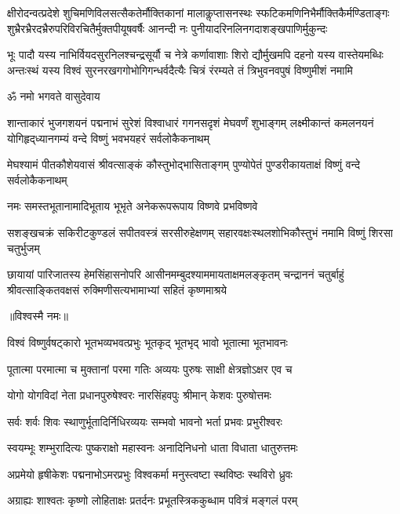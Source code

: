 \resetShloka
\setlength{\shlokaspaceskip}{12pt}
\fourlineindentedshloka
{क्षीरोदन्वत्प्रदेशे शुचिमणिविलसत्सैकतेर्मौक्तिकानां}
{मालाकॢप्तासनस्थः स्फटिकमणिनिभैर्मौक्तिकैर्मण्डिताङ्गः}
{शुभ्रैरभ्रैरदभ्रैरुपरिविरचितैर्मुक्तपीयूषवर्षैः}
{आनन्दी नः पुनीयादरिनलिनगदाशङ्खपाणिर्मुकुन्दः}

\fourlineindentedshloka
{भूः पादौ यस्य नाभिर्वियदसुरनिलश्चन्द्रसूर्यौ च नेत्रे}
{कर्णावाशाः शिरो द्यौर्मुखमपि दहनो यस्य वास्तेयमब्धिः}
{अन्तःस्थं यस्य विश्वं सुरनरखगगोभोगिगन्धर्वदैत्यैः}
{चित्रं रंरम्यते तं त्रिभुवनवपुषं विष्णुमीशं नमामि}

\centerline{ॐ नमो भगवते वासुदेवाय}
\fourlineindentedshloka
{शान्ताकारं भुजगशयनं पद्मनाभं सुरेशं}
{विश्वाधारं गगनसदृशं मेघवर्णं शुभाङ्गम्}
{लक्ष्मीकान्तं कमलनयनं योगिहृद्‌ध्यानगम्यं}
{वन्दे विष्णुं भवभयहरं सर्वलोकैकनाथम्}

\fourlineindentedshloka
{मेघश्यामं पीतकौशेयवासं}
{श्रीवत्साङ्कं कौस्तुभोद्भासिताङ्गम्}
{पुण्योपेतं पुण्डरीकायताक्षं}
{विष्णुं वन्दे सर्वलोकैकनाथम्}

\twolineshloka
{नमः समस्तभूतानामादिभूताय भूभृते}
{अनेकरूपरूपाय विष्णवे प्रभविष्णवे}

\fourlineindentedshloka
{सशङ्खचक्रं सकिरीटकुण्डलं}
{सपीतवस्त्रं सरसीरुहेक्षणम्}
{सहारवक्षःस्थलशोभिकौस्तुभं}
{नमामि विष्णुं शिरसा चतुर्भुजम्}

\fourlineindentedshloka
{छायायां पारिजातस्य हेमसिंहासनोपरि}
{आसीनमम्बुदश्याममायताक्षमलङ्कृतम्}
{चन्द्राननं चतुर्बाहुं श्रीवत्साङ्कितवक्षसं}
{रुक्मिणीसत्यभामाभ्यां सहितं कृष्णमाश्रये}

\centerline{॥विश्वस्मै नमः॥}\nopagebreak[4]
\resetShloka
\twolineshloka
{विश्वं विष्णुर्वषट्कारो भूतभव्यभवत्प्रभुः}
{भूतकृद् भूतभृद् भावो भूतात्मा भूतभावनः}

\twolineshloka
{पूतात्मा परमात्मा च मुक्तानां परमा गतिः}
{अव्ययः पुरुषः साक्षी क्षेत्रज्ञोऽक्षर एव च}

\twolineshloka
{योगो योगविदां नेता प्रधानपुरुषेश्वरः}
{नारसिंहवपुः श्रीमान् केशवः पुरुषोत्तमः}

\twolineshloka
{सर्वः शर्वः शिवः स्थाणुर्भूतादिर्निधिरव्ययः}
{सम्भवो भावनो भर्ता प्रभवः प्रभुरीश्वरः}

\twolineshloka
{स्वयम्भूः शम्भुरादित्यः पुष्कराक्षो महास्वनः}
{अनादिनिधनो धाता विधाता धातुरुत्तमः}

\twolineshloka
{अप्रमेयो हृषीकेशः पद्मनाभोऽमरप्रभुः}
{विश्वकर्मा मनुस्त्वष्टा स्थविष्ठः स्थविरो ध्रुवः}

\twolineshloka
{अग्राह्यः शाश्वतः कृष्णो लोहिताक्षः प्रतर्दनः}
{प्रभूतस्त्रिककुब्धाम पवित्रं मङ्गलं परम्}


